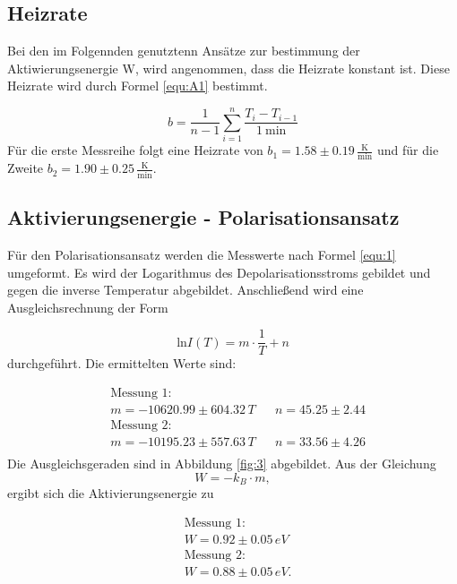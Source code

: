 \subsection{Heizrate}
\label{sec:Heizrate}

Bei den im Folgennden genutztenn Ansätze zur bestimmung der Aktiwierungsenergie W, wird angenommen, dass die Heizrate konstant ist.
Diese Heizrate wird durch Formel \ref{equ:A1} bestimmt.

\begin{equation}
    b = \frac{1}{n-1} \sum_{i=1}^{n} \frac{T_i - T_{i-1}}{\SI{1}{\minute}}
    \label{equ:A1}
\end{equation}
Für die erste Messreihe folgt eine Heizrate von $b_1 = 1.58 \pm 0.19 \,\frac{\text{K}}{\text{min}}$ und für die Zweite $b_2 = 1.90 \pm 0.25 \,\frac{\text{K}}{\text{min}}$.




\subsection{Aktivierungsenergie - Polarisationsansatz}
\label{sec:pol}

Für den Polarisationsansatz werden die Messwerte nach Formel \ref{equ:1} umgeformt. 
Es wird der Logarithmus des Depolarisationsstroms gebildet und gegen die inverse Temperatur abgebildet.
Anschließend wird eine Ausgleichsrechnung der Form 

\begin{equation}
    \text{ln} I(T) = m \cdot \frac{1}{T} + n
\end{equation}
durchgeführt.
Die ermittelten Werte sind:

\begin{align*}
    &\text{Messung 1:}\\
    & m = -10620.99 \pm 604.32 \,T    &&  n = 45.25 \pm 2.44   \\
    &\text{Messung 2:}\\
    & m = -10195.23 \pm 557.63 \,T    &&  n = 33.56 \pm 4.26   \\
\end{align*}
Die Ausgleichsgeraden sind in Abbildung \ref{fig:3} abgebildet.
Aus der Gleichung 
\begin{equation}
    W = -k_B \cdot m,
    \label{equ:A2}
\end{equation}
ergibt sich die Aktivierungsenergie zu

\begin{align*}
    &\text{Messung 1:}\\
    & W = 0.92 \pm 0.05 \,eV  \\
    &\text{Messung 2:}\\
    & W = 0.88 \pm 0.05 \,eV.  \\
\end{align*}

